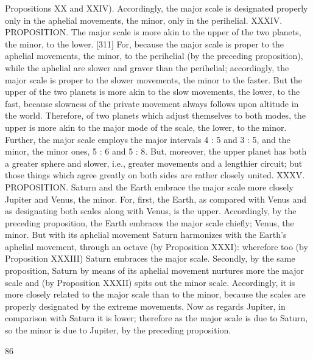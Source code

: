 \documentclass{article}
\begin{document}
Propositions XX and XXIV). Accordingly, the major scale is designated
properly only in the aphelial movements, the minor, only in the
perihelial.
XXXIV. PROPOSITION. The major scale is more akin to the upper of the
two planets, the minor, to the lower.
[311] For, because the major scale is proper to the aphelial movements,
the minor, to the perihelial (by the preceding proposition), while the
aphelial are slower and graver than the perihelial; accordingly, the major
scale is proper to the slower movements, the minor to the faster. But the
upper of the two planets is more akin to the slow movements, the lower,
to the fast, because slowness of the private movement always follows
upon altitude in the world. Therefore, of two planets which adjust
themselves to both modes, the upper is more akin to the major mode of
the scale, the lower, to the minor. Further, the major scale employs the
major intervals 4 : 5 and 3 : 5, and the minor, the minor ones, 5 : 6 and 5
: 8. But, moreover, the upper planet has both a greater sphere and
slower, i.e., greater movements and a lengthier circuit; but those things
which agree greatly on both sides are rather closely united.
XXXV. PROPOSITION. Saturn and the Earth embrace the major scale
more closely Jupiter and Venus, the minor.
For, first, the Earth, as compared with Venus and as designating both
scales along with Venus, is the upper. Accordingly, by the preceding
proposition, the Earth embraces the major scale chiefly; Venus, the
minor. But with its aphelial movement Saturn harmonizes with the
Earth's aphelial movement, through an octave (by Proposition XXXI):
wherefore too (by Proposition XXXIII) Saturn embraces the major scale.
Secondly, by the same proposition, Saturn by means of its aphelial
movement nurtures more the major scale and (by Proposition XXXII)
spits out the minor scale. Accordingly, it is more closely related to the
major scale than to the minor, because the scales are properly designated
by the extreme movements.
Now as regards Jupiter, in comparison with Saturn it is lower; therefore
as the major scale is due to Saturn, so the minor is due to Jupiter, by the
preceding proposition.


86
\end{document}
